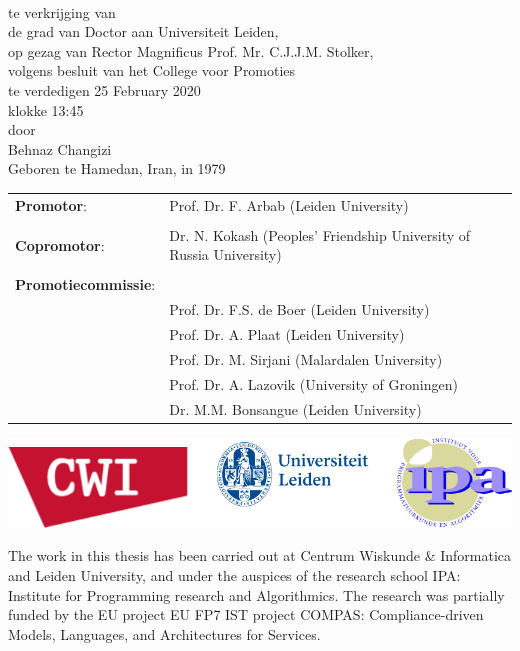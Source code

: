 \newpage
{
 \vspace*{1.5cm}
  \\
 \vspace*{1.5cm}
te verkrijging van
 \\ de grad van Doctor aan Universiteit Leiden,
 \\
op gezag van Rector Magnificus Prof. Mr. C.J.J.M. Stolker,
 \\
volgens besluit van het College voor Promoties
\\
te verdedigen 25 February 2020
\\
klokke 13:45 \\
 \vspace*{3cm}
door
 \\
  \vspace*{.7cm}
Behnaz Changizi
 \\
   \vspace*{.7cm} \hspace*{3.3cm}
Geboren te Hamedan, Iran, in 1979
}



\newpage
 \vspace*{1.5cm}
 \begin{flushleft}
\begin{tabular}{ l l }
 {\textbf{Promotor}}:  & Prof. Dr. F. Arbab (Leiden University)  \\ 
 &\\
	{\textbf{Copromotor}}: &  Dr. N. Kokash  (Peoples' Friendship University of Russia University)  \\ 
 &\\
{\textbf{Promotiecommissie}}: &  \\  
 &Prof. Dr. F.S. de Boer    (Leiden University)\\  
 & Prof. Dr. A. Plaat    (Leiden University)\\ 
& Prof. Dr. M. Sirjani (Malardalen University)\\
&Prof. Dr. A. Lazovik (University of Groningen) \\
& Dr. M.M. Bonsangue (Leiden University)
\end{tabular}
\end{flushleft} 


\vspace{7cm}
\begin{center}
\includegraphics{img/ipa}
\end{center}
The work in this thesis has been carried out at Centrum Wiskunde \& Informatica and Leiden University, and under the auspices of the research school
IPA: Institute for Programming research and Algorithmics. The research was
partially funded by the EU project EU FP7 IST project COMPAS: Compliance-driven Models, Languages, and Architectures for Services.
